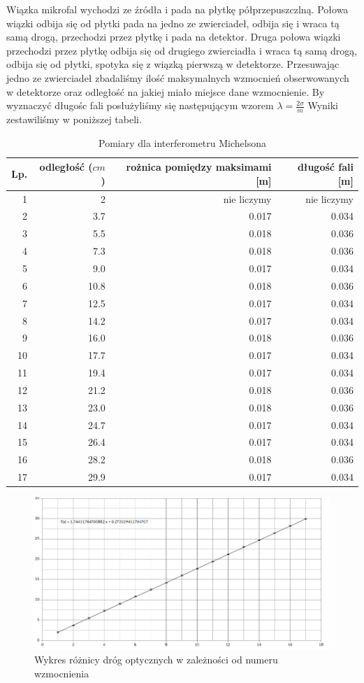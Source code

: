\documentclass[a4paper]{article}
\begin{document}
 Wiązka mikrofal wychodzi ze źródła i pada na płytkę półprzepuszczlną. Połowa  wiązki odbija się od płytki pada na jedno ze zwierciadeł, odbija się i wraca tą samą drogą, przechodzi przez płytkę i pada na detektor.  Druga połowa wiązki przechodzi przez płytkę odbija się od drugiego zwierciadła i wraca tą samą drogą, odbija się od płytki, spotyka się z wiązką pierwszą w detektorze. Przesuwając jedno ze zwierciadeł zbadaliśmy ilość maksymalnych wzmocnień obserwowanych w detektorze oraz odległość na jakiej miało miejsce dane wzmocnienie.
By wyznaczyć długośc fali posłużyliśmy się następującym wzorem $\lambda = \frac{2 \sigma}{m}$
 Wyniki zestawiliśmy w poniższej tabeli. 
\newpage
\begin{table}[h!]
\centering
\begin{tabular}{rrrr}
\toprule
Lp. &  odległość ($cm$) & rożnica pomiędzy maksimami [m] & długość fali [m]\\
\midrule
1 & 2 & nie liczymy & nie liczymy\\
2 & 3.7 & 0.017 & 0.034\\
3 & 5.5 & 0.018 & 0.036\\
4 & 7.3 & 0.018 & 0.036\\
5 & 9.0 & 0.017 & 0.034\\
6 & 10.8 & 0.018 & 0.036\\
7 & 12.5 & 0.017 & 0.034\\
8 & 14.2 & 0.017 & 0.034\\
9 & 16.0 & 0.018 & 0.036\\
10 & 17.7 & 0.017 & 0.034\\
11 & 19.4 & 0.017 & 0.034\\
12 & 21.2 & 0.018 & 0.036\\
13 & 23.0 & 0.018 & 0.036\\
14 & 24.7 & 0.017 & 0.034\\
15 & 26.4 & 0.017 & 0.034\\
16 & 28.2 & 0.018 & 0.036\\
17 & 29.9 & 0.017 & 0.034\\
\bottomrule
\end{tabular}
\caption{Pomiary dla interferometru Michelsona}
\label{pomiary_michelson}
\end{table}

\begin{figure}[h!]
\centering
\includegraphics[scale=0.6]{michelson_micro.png}
\caption{Wykres różnicy dróg optycznych w zależności od numeru wzmocnienia}
\label{michelson}
\end{figure}
\end{document}
